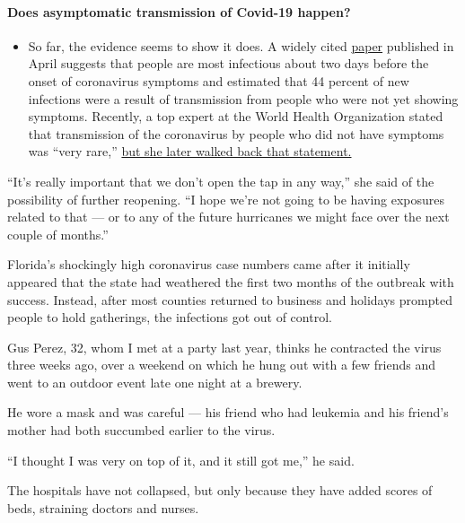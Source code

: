 \begin{itemize}
{  \paragraph{Does asymptomatic transmission of Covid-19
  happen?}\label{does-asymptomatic-transmission-of-covid-19-happen}}

  \begin{itemize}
  \tightlist
  \item
    So far, the evidence seems to show it does. A widely cited
    \href{https://www.nature.com/articles/s41591-020-0869-5}{paper}
    published in April suggests that people are most infectious about
    two days before the onset of coronavirus symptoms and estimated that
    44 percent of new infections were a result of transmission from
    people who were not yet showing symptoms. Recently, a top expert at
    the World Health Organization stated that transmission of the
    coronavirus by people who did not have symptoms was ``very rare,''
    \href{https://www.nytimes3xbfgragh.onion/2020/06/09/world/coronavirus-updates.html?action=click\&pgtype=Article\&state=default\&region=MAIN_CONTENT_3\&context=storylines_faq\#link-1f302e21}{but
    she later walked back that statement.}
  \end{itemize}
\end{itemize}

``It's really important that we don't open the tap in any way,'' she
said of the possibility of further reopening. ``I hope we're not going
to be having exposures related to that --- or to any of the future
hurricanes we might face over the next couple of months.''

Florida's shockingly high coronavirus case numbers came after it
initially appeared that the state had weathered the first two months of
the outbreak with success. Instead, after most counties returned to
business and holidays prompted people to hold gatherings, the infections
got out of control.

Gus Perez, 32, whom I met at a party last year, thinks he contracted the
virus three weeks ago, over a weekend on which he hung out with a few
friends and went to an outdoor event late one night at a brewery.

He wore a mask and was careful --- his friend who had leukemia and his
friend's mother had both succumbed earlier to the virus.

``I thought I was very on top of it, and it still got me,'' he said.

The hospitals have not collapsed, but only because they have added
scores of beds, straining doctors and nurses.

